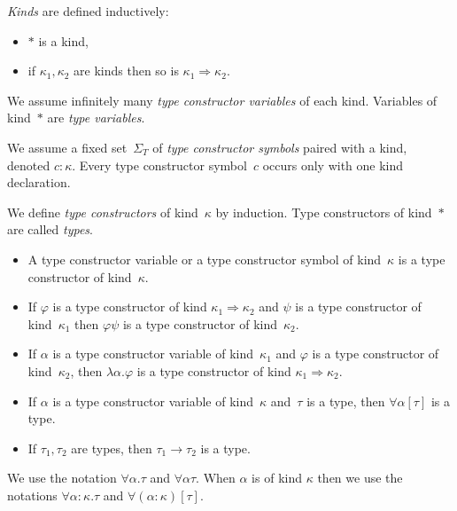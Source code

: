 \documentclass[runningheads,a4paper]{llncs}
\newcommand{\arrtype}{\rightarrow}
\newcommand{\arrkind}{\Rightarrow}
\begin{document}
\begin{definition}\normalfont
  \emph{Kinds} are defined inductively:
  \begin{itemize}
  \item $*$ is a kind,
  \item if $\kappa_1,\kappa_2$ are kinds then so is $\kappa_1 \arrkind
    \kappa_2$.
  \end{itemize}

  We assume infinitely many \emph{type constructor variables} of each
  kind. Variables of kind~$*$ are \emph{type variables}.

  We assume a fixed set~$\Sigma_T$ of \emph{type constructor symbols}
  paired with a kind, denoted $c : \kappa$. Every type constructor
  symbol~$c$ occurs only with one kind declaration.

  We define \emph{type constructors} of kind~$\kappa$ by induction.
  Type constructors of kind~$*$ are called \emph{types}.
  \begin{itemize}
  \item A type constructor variable or a type constructor symbol of
    kind~$\kappa$ is a type constructor of kind~$\kappa$.
  \item If $\varphi$ is a type constructor of kind $\kappa_1 \arrkind
    \kappa_2$ and $\psi$ is a type constructor of kind~$\kappa_1$ then
    $\varphi \psi$ is a type constructor of kind~$\kappa_2$.
  \item If $\alpha$ is a type constructor variable of kind~$\kappa_1$
    and $\varphi$ is a type constructor of kind~$\kappa_2$, then
    $\lambda\alpha . \varphi$ is a type constructor of kind $\kappa_1
    \arrkind \kappa_2$.
  \item If $\alpha$ is a type constructor variable of kind~$\kappa$
    and~$\tau$ is a type, then $\forall \alpha[\tau]$ is a type.
  \item If $\tau_1,\tau_2$ are types, then $\tau_1 \arrtype \tau_2$ is
    a type.
  \end{itemize}

  We use the notation $\forall \alpha . \tau$ and $\forall \alpha
  \tau$. When $\alpha$ is of kind $\kappa$ then we use the notations
  $\forall \alpha : \kappa . \tau$ and $\forall (\alpha :
  \kappa)[\tau]$.


\end{definition}
\end{document}
